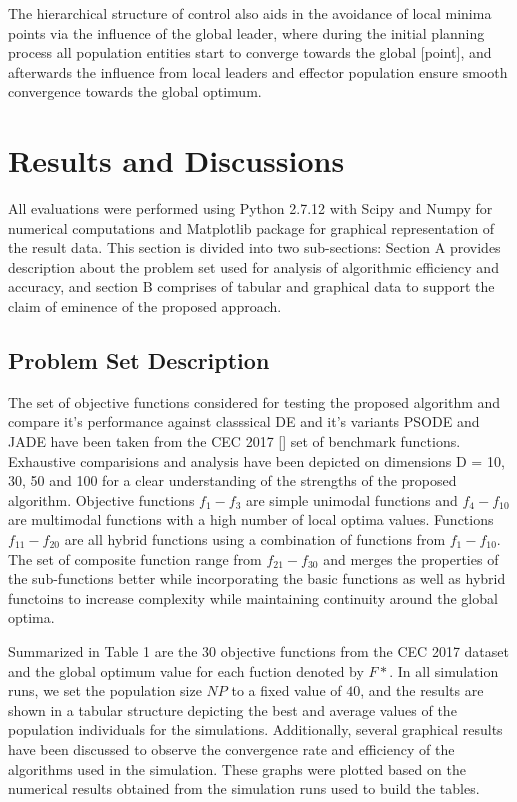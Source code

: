 The hierarchical structure of control also aids in the avoidance of local minima points via the influence of the global leader, where during the initial planning process all population entities start to converge towards the global [point], and afterwards the influence from local leaders and effector population ensure smooth convergence towards the global optimum.


\section{Results and Discussions}

All evaluations were performed using Python 2.7.12 with Scipy\cite{oliphant2007python} and Numpy\cite{van2011numpy} for numerical computations and Matplotlib \cite{Hunter:2007} package for graphical representation of the result data. This section is divided into two sub-sections: Section A provides description about the problem set used for analysis of algorithmic efficiency and accuracy, and section B comprises of tabular and graphical data to support the claim of eminence of the proposed approach.

\subsection{Problem Set Description}

The set of objective functions considered for testing the proposed algorithm and compare it's performance against classsical DE and it's variants PSODE and JADE have been taken from the CEC 2017 [] set of benchmark functions. Exhaustive comparisions and analysis have been depicted on dimensions D = 10, 30, 50 and 100 for a clear understanding of the strengths of the proposed algorithm. Objective functions $f_1 - f_3$ are simple unimodal functions and $f_4 - f_10$ are multimodal functions with a high number of local optima values. Functions $f_11 - f_20$ are all hybrid functions using a combination of functions from $f_1 - f_10$. The set of composite function range from $f_21 - f_30$ and merges the properties of the sub-functions better while incorporating the basic functions as well as hybrid functoins to increase complexity while maintaining continuity around the global optima.

Summarized in Table 1 are the 30 objective functions from the CEC 2017 dataset and the global optimum value for each fuction denoted by $F*$. In all simulation runs, we set the population size $NP$ to a fixed value of $40$, and the results are shown in a tabular structure depicting the best and average values of the population individuals for the simulations. Additionally, several graphical results have been discussed to observe the convergence rate and efficiency of the algorithms used in the simulation. These graphs were plotted based on the numerical results obtained from the simulation runs used to build the tables.

